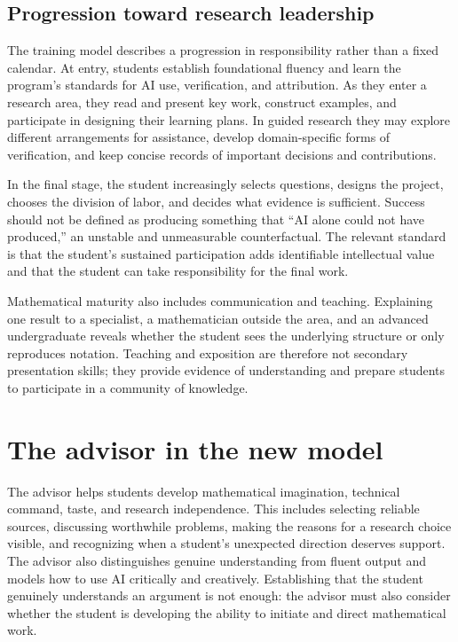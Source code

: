 \documentclass[11pt]{article}
\begin{document}
\subsection{Progression toward research leadership}

The training model describes a progression in responsibility rather than a fixed
calendar.  At entry, students establish foundational fluency and learn the program's
standards for AI use, verification, and attribution.  As they enter a research area, they
read and present key work, construct examples, and participate in designing their
learning plans.  In guided research they may explore different arrangements for assistance, develop
domain-specific forms of verification, and keep concise records of important decisions
and contributions.

In the final stage, the student increasingly selects questions, designs the project,
chooses the division of labor, and decides what evidence is sufficient.  Success should
not be defined as producing something that ``AI alone could not have produced,'' an
unstable and unmeasurable counterfactual.  The relevant standard is that the student's
sustained participation adds identifiable intellectual value and that the student can
take responsibility for the final work.

Mathematical maturity also includes communication and teaching.  Explaining one result to
a specialist, a mathematician outside the area, and an advanced undergraduate reveals
whether the student sees the underlying structure or only reproduces notation.  Teaching
and exposition are therefore not secondary presentation skills; they provide evidence of
understanding and prepare students to participate in a community of knowledge.

\section{The advisor in the new model}
\label{sec:advisor-model}

The advisor helps students develop mathematical imagination, technical command, taste,
and research independence. This includes selecting reliable sources, discussing
worthwhile problems, making the reasons for a research choice visible, and recognizing
when a student's unexpected direction deserves support. The advisor also distinguishes
genuine understanding from fluent output and models how to use AI critically and
creatively. Establishing that the student genuinely understands an argument is not
enough: the advisor must also consider whether the student is developing the ability
to initiate and direct mathematical work.
\end{document}
